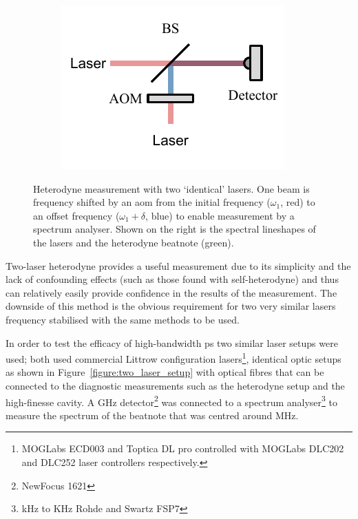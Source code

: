 \begin{figure}
    \begin{subfigure}{0.49\linewidth}
    \includegraphics{part1/Figs/HeterodyneTwoLasers.pdf}
    \end{subfigure}
    \begin{subfigure}{0.49\linewidth}
    
    \end{subfigure}
    \caption{Heterodyne measurement with two `identical' lasers. One beam is frequency shifted by an \gls{aom} from the initial frequency ($\omega_1$, red) to an offset frequency ($\omega_1+\delta$, blue) to enable measurement by a spectrum analyser. Shown on the right is the spectral lineshapes of the lasers and the heterodyne beatnote (green).}
    \label{figure:two-laser_heterodyne}
\end{figure}

Two-laser heterodyne provides a useful measurement due to its simplicity and the lack of confounding effects (such as those found with self-heterodyne) and thus can relatively easily provide confidence in the results of the measurement.
The downside of this method is the obvious requirement for two very similar lasers frequency stabilised with the same methods to be used.

In order to test the efficacy of high-bandwidth \gls{ps} two similar laser setups were used; both used commercial Littrow configuration lasers\footnote{MOGLabs ECD003 and Toptica DL pro controlled with MOGLabs DLC202 and DLC252 laser controllers respectively.}, identical optic setups as shown in Figure~\ref{figure:two_laser_setup} with optical fibres that can be connected to the diagnostic measurements such as the heterodyne setup and the high-finesse cavity.
A \unit[1]{GHz} detector\footnote{NewFocus 1621} was connected to a spectrum analyser\footnote{\unit[9]{kHz} to \unit[7]{KHz} Rohde and Swartz FSP7} to measure the spectrum of the beatnote that was centred around \unit[80]{MHz}.

